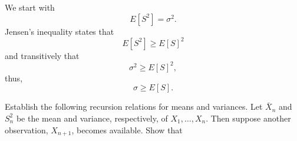 \documentclass[12pt,letterpaper]{exam}
\begin{document}
\begin{questions}
	\begin{solution}
		We start with
		\[E[S^2] = \sigma^2.\]
		Jensen's inequality states that 
		\[E[S^2] \geq E[S]^2\]
		and transitively that
		\[\sigma^2 \geq E[S]^2,\]
		thus,
		\[\sigma \geq E[S].\]
		
	\end{solution}
	
	\setcounter{question}{14}
	\question 
	Establish the following recursion relations for means and variances. 
	Let \(\bar{X}_n\) and \(S_n^2\) be the mean and variance, respectively, of \(X_1,\ldots,X_n\). 
	Then suppose another observation, \(X_{n+1}\), becomes available. Show that
	
	
	\begin{solution}
		\begin{parts}
			\part
			\[
			\bar{X}_{n+1} = \frac{\sum_{i=1}^{n+1}X_i}{n+1} = \frac{X_{n+1} + \sum_{i=1}^{n}X_i}{n+1} = \frac{X_{n+1} + n\bar X_n}{n+1}
			\]
			

\end{parts}
\end{solution}
\end{questions}
\end{document}
